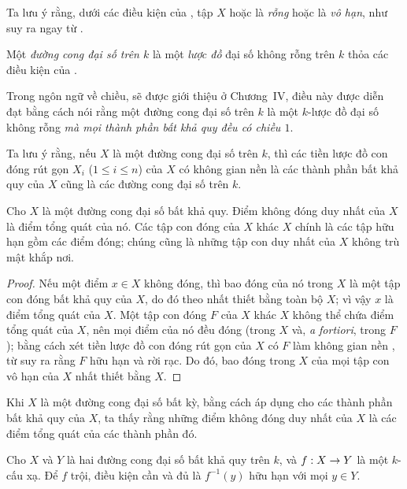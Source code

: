 \documentclass[oneside,10pt]{amsart}
\makeatletter
\renewcommand{\leq}{\leqslant}
\newcommand{\ega@arrow}[2]{\mathchoice{#1}{#2}{#2}{#2}}
\renewcommand{\to}{\ega@arrow{\longrightarrow}{\rightarrow}}
\newcommand{\oldpage}[2][]{\marginnote{\normalfont\footnotesize\textbf{#1}~|~#2}\ignorespaces}
\let\EGAOriginalLabel\label
\renewcommand{\label}[1]{\phantomsection\EGAOriginalLabel{#1}}
\makeatother
\begin{document}
Ta lưu ý rằng, dưới các điều kiện của , tập $X$ hoặc là \emph{rỗng} hoặc là \emph{vô hạn}, như suy ra ngay từ .

\begin{definition}[7.4.2]
\label{II.7.4.2}
Một \emph{đường cong đại số trên $k$} là một \emph{lược đồ} đại số không rỗng trên $k$ thỏa các điều kiện của .
\end{definition}

Trong ngôn ngữ về chiều, sẽ được giới thiệu ở Chương~IV, điều này được diễn đạt bằng cách nói rằng một đường cong đại số trên $k$ là một $k$-lược đồ đại số không rỗng \emph{mà mọi thành phần bất khả quy đều có chiều $1$}.

Ta lưu ý rằng, nếu $X$ là một đường cong đại số trên $k$, thì các tiền lược đồ con đóng rút gọn $X_i$ ($1\leq i\leq n$) của $X$ có không gian nền là các thành phần bất khả quy của $X$ cũng là các đường cong đại số trên $k$.

\begin{corollary}[7.4.3]
\label{II.7.4.3}
Cho $X$ là một đường cong đại số bất khả quy.
Điểm không đóng duy nhất của $X$ là điểm tổng quát của nó.
Các tập con đóng của $X$ khác $X$ chính là các tập hữu hạn gồm các điểm đóng;
chúng cũng là những tập con duy nhất của $X$ không trù mật khắp nơi.
\end{corollary}

\begin{proof}
Nếu một điểm $x\in X$ không đóng, thì bao đóng của nó trong $X$ là một tập con đóng bất khả quy của $X$, do đó theo  nhất thiết bằng toàn bộ $X$; vì vậy $x$ là điểm tổng quát của $X$.
Một tập con đóng $F$ của $X$ khác $X$ không thể chứa
\oldpage[II]{149}
điểm tổng quát của $X$, nên mọi điểm của nó đều đóng (trong $X$ và, \emph{a fortiori}, trong $F$);
bằng cách xét tiền lược đồ con đóng rút gọn của $X$ có $F$ làm không gian nền , từ  suy ra rằng $F$ hữu hạn và rời rạc.
Do đó, bao đóng trong $X$ của mọi tập con vô hạn của $X$ nhất thiết bằng $X$.
\end{proof}

Khi $X$ là một đường cong đại số bất kỳ, bằng cách áp dụng  cho các thành phần bất khả quy của $X$, ta thấy rằng những điểm không đóng duy nhất của $X$ là các điểm tổng quát của các thành phần đó.

\begin{corollary}[7.4.4]
\label{II.7.4.4}
Cho $X$ và $Y$ là hai đường cong đại số bất khả quy trên $k$, và $f:X\to Y$ là một $k$-cấu xạ.
Để $f$ trội, điều kiện cần và đủ là $f^{-1}(y)$ hữu hạn với mọi $y\in Y$.
\end{corollary}
\end{document}
